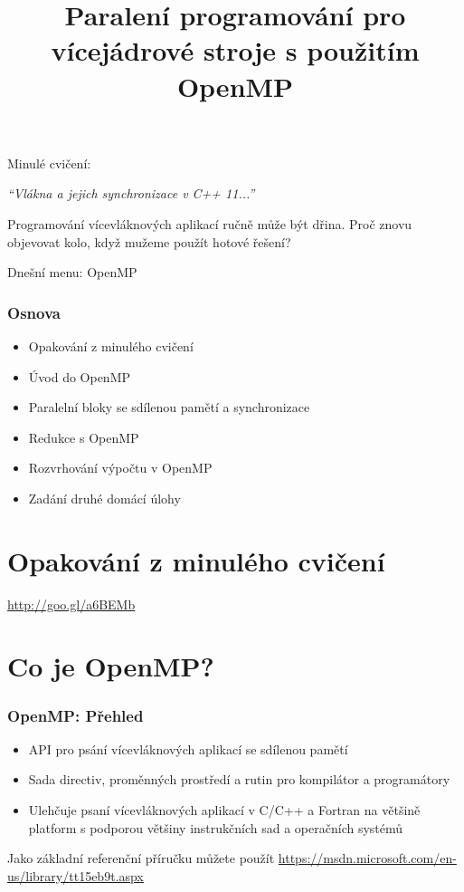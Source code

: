 \documentclass[usenames,dvipsnames,9pt]{beamer}
\title{Paralení programování pro vícejádrové stroje s použitím OpenMP}
\date{}
\institute{B4B36PDV -- Paralelní a distribuované výpočty}
\begin{document}
\maketitle

\begin{frame}
  Minulé cvičení:
  \begin{center}
    \Large\emph{``Vlákna a jejich synchronizace v C++ 11...''}
  \end{center}
  \pause
  \vspace{1.5em}
  
  Programování vícevláknových aplikací ručně může být dřina. Proč znovu objevovat kolo, když mužeme použít hotové řešení?

  \pause
  \vspace{2.5em}
  Dnešní menu: \hspace{10pt} \huge OpenMP
\end{frame}

\begin{frame}
  \frametitle{Osnova}
  \begin{itemize}
    \item Opakování z minulého cvičení
    \item Úvod do OpenMP
    \item Paralelní bloky se sdílenou pamětí a synchronizace
    \item Redukce s OpenMP
    \item Rozvrhování výpočtu v OpenMP\\[1.5em]
    \item Zadání druhé domácí úlohy
  \end{itemize}
\end{frame}

\section{Opakování z minulého cvičení}
\begin{frame}[standout]
  \Huge
  \url{http://goo.gl/a6BEMb}
\end{frame}

\section{Co je OpenMP?}
\begin{frame}
  \frametitle{OpenMP: Přehled}
  \begin{itemize}
    \item API pro psání vícevláknových aplikací se sdílenou pamětí
    \item Sada directiv, proměnných prostředí a rutin pro kompilátor a programátory
    \item Ulehčuje psaní vícevláknových aplikací v C/C++ a Fortran na většině platform s podporou většiny instrukčních sad a operačních systémů
  \end{itemize}
  \pause
  {\small
  Jako základní referenční příručku můžete použít \url{https://msdn.microsoft.com/en-us/library/tt15eb9t.aspx}}
\end{frame}
\end{document}
